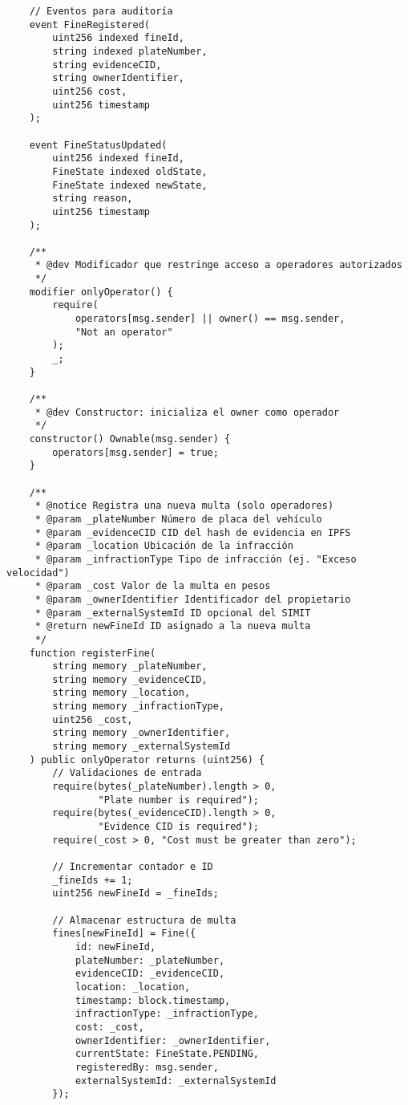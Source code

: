 \begin{verbatim}
    // Eventos para auditoría
    event FineRegistered(
        uint256 indexed fineId,
        string indexed plateNumber,
        string evidenceCID,
        string ownerIdentifier,
        uint256 cost,
        uint256 timestamp
    );

    event FineStatusUpdated(
        uint256 indexed fineId,
        FineState indexed oldState,
        FineState indexed newState,
        string reason,
        uint256 timestamp
    );

    /**
     * @dev Modificador que restringe acceso a operadores autorizados
     */
    modifier onlyOperator() {
        require(
            operators[msg.sender] || owner() == msg.sender,
            "Not an operator"
        );
        _;
    }

    /**
     * @dev Constructor: inicializa el owner como operador
     */
    constructor() Ownable(msg.sender) {
        operators[msg.sender] = true;
    }

    /**
     * @notice Registra una nueva multa (solo operadores)
     * @param _plateNumber Número de placa del vehículo
     * @param _evidenceCID CID del hash de evidencia en IPFS
     * @param _location Ubicación de la infracción
     * @param _infractionType Tipo de infracción (ej. "Exceso velocidad")
     * @param _cost Valor de la multa en pesos
     * @param _ownerIdentifier Identificador del propietario
     * @param _externalSystemId ID opcional del SIMIT
     * @return newFineId ID asignado a la nueva multa
     */
    function registerFine(
        string memory _plateNumber,
        string memory _evidenceCID,
        string memory _location,
        string memory _infractionType,
        uint256 _cost,
        string memory _ownerIdentifier,
        string memory _externalSystemId
    ) public onlyOperator returns (uint256) {
        // Validaciones de entrada
        require(bytes(_plateNumber).length > 0, 
                "Plate number is required");
        require(bytes(_evidenceCID).length > 0, 
                "Evidence CID is required");
        require(_cost > 0, "Cost must be greater than zero");

        // Incrementar contador e ID
        _fineIds += 1;
        uint256 newFineId = _fineIds;

        // Almacenar estructura de multa
        fines[newFineId] = Fine({
            id: newFineId,
            plateNumber: _plateNumber,
            evidenceCID: _evidenceCID,
            location: _location,
            timestamp: block.timestamp,
            infractionType: _infractionType,
            cost: _cost,
            ownerIdentifier: _ownerIdentifier,
            currentState: FineState.PENDING,
            registeredBy: msg.sender,
            externalSystemId: _externalSystemId
        });


\end{verbatim}
